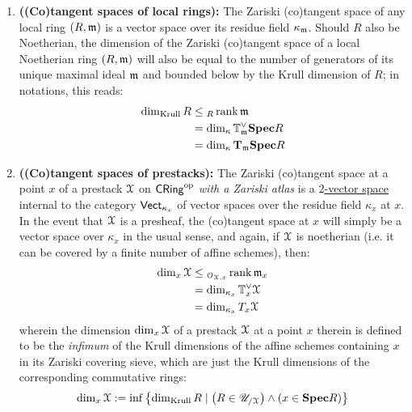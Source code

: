             \begin{proposition} \label{prop: Zariski_tangent_spaces_are_vector_spaces} 
                \noindent
                \begin{enumerate}
                    \item \textbf{\textbf{((Co)tangent spaces of local rings):}} The Zariski (co)tangent space of any local ring $(R, \mathfrak{m})$ is a vector space over its residue field $\kappa_{\mathfrak{m}}$. Should $R$ also be Noetherian, the dimension of the Zariski (co)tangent space of a local Noetherian ring $(R, \mathfrak{m})$ will also be equal to the number of generators of its unique maximal ideal $\mathfrak{m}$ and bounded below by the Krull dimension of $R$; in notations, this reads:
                        $$
                            \begin{aligned}
                                \dim_{\mathrm{Krull}} R & \leq {}_R\operatorname{rank} \mathfrak{m}
                                \\
                                & = \dim_{\kappa} \mathbb{T}^{\vee}_{\mathfrak{m}} \mathbf{Spec} R
                                \\
                                & = \dim_{\kappa} \mathbf{T}_{\mathfrak{m}} \mathbf{Spec} R
                            \end{aligned}
                        $$
                    \item \textbf{((Co)tangent spaces of prestacks):} The Zariski (co)tangent space at a point $x$ of a prestack $\mathcal{X}$ on $\mathsf{CRing}^{\mathrm{op}}$ \textit{with a Zariski atlas} is a \href{https://ncatlab.org/nlab/show/2-vector+space}{\underline{$2$-vector space}} internal to the category $\mathsf{Vect}_{\kappa_x}$ of vector spaces over the residue field $\kappa_x$ at $x$. In the event that $\mathcal{X}$ is a presheaf, the (co)tangent space at $x$ will simply be a vector space over $\kappa_x$ in the usual sense, and again, if $\mathcal{X}$ is noetherian (i.e. it can be covered by a finite number of affine schemes), then:
                        $$
                            \begin{aligned}
                                \dim_x \mathcal{X} & \leq {}_{\mathcal{O}_{\mathcal{X}, x}}\operatorname{rank} \mathfrak{m}_x
                                \\
                                & = \dim_{\kappa_x} \mathbb{T}^{\vee}_x \mathcal{X}
                                \\
                                & = \dim_{\kappa_x} T_x \mathcal{X}
                            \end{aligned}
                        $$
                    wherein the dimension $\dim_x \mathcal{X}$ of a prestack $\mathcal{X}$ at a point $x$ therein is defined to be the \textit{infimum} of the Krull dimensions of the affine schemes containing $x$ in its Zariski covering sieve, which are just the Krull dimensions of the corresponding commutative rings:
                        $$\dim_x \mathcal{X} := \inf \left\{ \dim_{\mathrm{Krull}} R \mid \left(R \in \mathscr{U}_{/\mathcal{X}}\right) \wedge (x \in \mathbf{Spec} R) \right\}$$
                \end{enumerate}
            \end{proposition}
